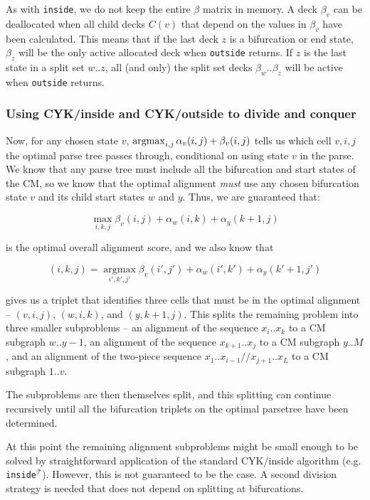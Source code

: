 \documentclass[11pt]{article}
\def\argmax{\mathop{\mathrm{argmax}}\limits}
\begin{document}
As with \texttt{inside}, we do not keep the entire $\beta$ matrix in
memory. A deck $\beta_v$ can be deallocated when all child decks
$C(v)$ that depend on the values in $\beta_v$ have been
calculated. This means that if the last deck $z$ is a bifurcation or
end state, $\beta_z$ will be the only active allocated deck when
\texttt{outside} returns. If $z$ is the last state in a split set
$w..z$, all (and only) the split set decks $\beta_w..\beta_z$ will be
active when \texttt{outside} returns.

\subsubsection{Using CYK/inside and CYK/outside to divide and conquer}

Now, for any chosen state $v$, $\argmax\nolimits_{i,j} \alpha_{v}(i,j) +
\beta_{v}(i,j)$ tells us which cell $v,i,j$ the optimal parse tree
passes through, conditional on using state $v$ in the parse. We know
that any parse tree must include all the bifurcation and start states
of the CM, so we know that the optimal alignment \emph{must} use any
chosen bifurcation state $v$ and its child start states $w$ and
$y$. Thus, we are guaranteed that:

\[
   \max_{i,k,j} \beta_{v}(i,j) + \alpha_{w}(i,k) + \alpha_{y}(k+1,j)
\]

is the optimal overall alignment score, and we also know that

\[
      (i,k,j) = \argmax_{i',k',j'}  \beta_{v}(i',j') +
      \alpha_{w}(i',k') + \alpha_{y}(k'+1,j') 
\]

gives us a triplet that identifies three cells that must be in the
optimal alignment -- $(v,i,j)$, $(w,i,k)$, and $(y,k+1,j)$. This
splits the remaining problem into three smaller subproblems -- an
alignment of the sequence $x_{i}..x_{k}$ to a CM subgraph $w..y-1$, an
alignment of the sequence $x_{k+1}..x_{j}$ to a CM subgraph $y..M$,
and an alignment of the two-piece sequence
$x_1..x_{i-1}//x_{j+1}..x_L$ to a CM subgraph $1..v$.

The subproblems are then themselves split, and this splitting can
continue recursively until all the bifurcation triplets on the optimal
parsetree have been determined.

At this point the remaining alignment subproblems might be small
enough to be solved by straightforward application of the standard
CYK/inside algorithm (e.g. \texttt{inside}$^\mathcal{T}$). However,
this is not guaranteed to be the case. A second division strategy is
needed that does not depend on splitting at bifurcations.
\end{document}
